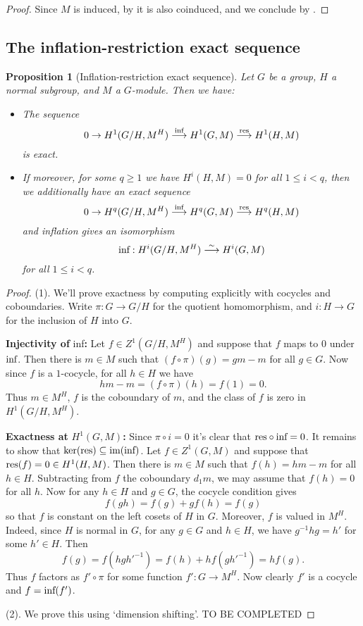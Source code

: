 \documentclass[11pt]{amsart}
\numberwithin{equation}{section}
\newtheorem{proposition}[equation]{Proposition}
\theoremstyle{remark}
\theoremstyle{remark}
\theoremstyle{remark}
\theoremstyle{definition}
\theoremstyle{definition}
\theoremstyle{definition}
\theoremstyle{definition}
\theoremstyle{definition}
\theoremstyle{definition}
\begin{document}
\begin{proof}
Since $M$ is induced, by  it is also coinduced, and we conclude by .
\end{proof}

\subsection{The inflation-restriction exact sequence}

\begin{proposition}[Inflation-restriction exact sequence]
Let $G$ be a group, $H$ a normal subgroup, and $M$ a $G$-module. Then we have:
\begin{itemize}
\item[(1)]
The sequence
\[0\rightarrow H^1(G/H,M^H)\stackrel{\textup{inf}}{\longrightarrow}H^1(G,M)\stackrel{\textup{res}}{{\longrightarrow}}H^1(H,M)\]
is exact.
\item[(2)]
If moreover, for some $q\geq 1$ we have $H^i(H,M)=0$ for all $1\leq i<q$, then we additionally have an exact sequence
\[0\rightarrow H^q(G/H,M^H)\stackrel{\textup{inf}}{\longrightarrow}H^q(G,M)\stackrel{\textup{res}}{{\longrightarrow}}H^q(H,M)\]
and inflation gives an isomorphism
\[\textup{inf}:H^i(G/H,M^H)\stackrel{\sim}{\longrightarrow}H^i(G,M)\]
for all $1\leq i<q$.
\end{itemize}
\end{proposition}

\begin{proof}
(1). We'll prove exactness by computing explicitly with cocycles and coboundaries. Write $\pi:G\rightarrow G/H$ for the quotient homomorphism, and $i:H\rightarrow G$ for the inclusion of $H$ into $G$.

\textbf{Injectivity of }\textup{inf}\textbf{:} Let $f\in Z^1(G/H,M^H)$ and suppose that $f$ maps to $0$ under $\textup{inf}$. Then there is $m\in M$ such that $(f\circ\pi)(g)=gm-m$ for all $g\in G$. Now since $f$ is a $1$-cocycle, for all $h\in H$ we have
\[hm-m=(f\circ\pi)(h)=f(1)=0.\]
Thus $m\in M^H$, $f$ is the coboundary of $m$, and the class of $f$ is zero in $H^1(G/H,M^H)$.

\textbf{Exactness at }$H^1(G,M)$\textbf{:} Since $\pi\circ i=0$ it's clear that $\textup{res}\circ \textup{inf}=0$. It remains to show that $\textup{ker}(\textup{res})\subseteq \textup{im}(\textup{inf})$. Let $f\in Z^1(G,M)$ and suppose that $\textup{res}(f)=0\in H^1(H,M)$. Then there is $m\in M$ such that $f(h)=hm-m$ for all $h\in H$. Subtracting from $f$ the coboundary $d_1m$, we may assume that $f(h)=0$ for all $h$. Now for any $h\in H$ and $g\in G$, the cocycle condition gives
\[f(gh)=f(g)+gf(h)=f(g)\]
so that $f$ is constant on the left cosets of $H$ in $G$. Moreover, $f$ is valued in $M^H$. Indeed, since $H$ is normal in $G$, for any $g\in G$ and $h\in H$, we have $g^{-1}hg=h'$ for some $h'\in H$. Then 
\[f(g)=f(hgh'^{-1})=f(h)+hf(gh'^{-1})=hf(g).\]
Thus $f$ factors as $f'\circ \pi$ for some function $f':G\rightarrow M^H$. Now clearly $f'$ is a cocycle and $f=\textup{inf}(f')$.
 
(2). We prove this using `dimension shifting'. TO BE COMPLETED


\end{proof}
\end{document}
